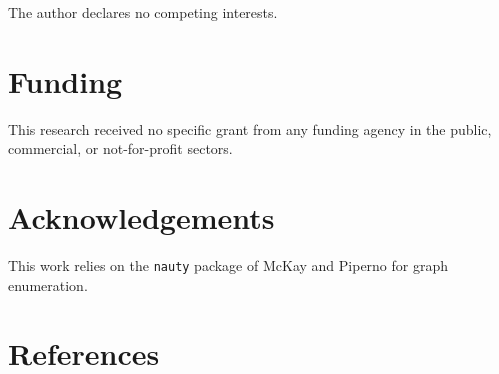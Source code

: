\documentclass[
]{article}
\begin{document}
The author declares no competing interests.

\section{Funding}\label{sec-funding}

This research received no specific grant from any funding agency in the
public, commercial, or not-for-profit sectors.

\section{Acknowledgements}\label{sec-acknowledgements}

This work relies on the \texttt{nauty} package of McKay and Piperno for
graph enumeration.

\section{References}\label{references}
\end{document}
